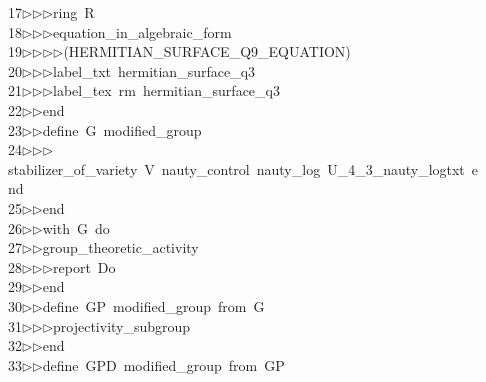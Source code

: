 \begin{tabbing}
17\>$\triangleright$\>$\triangleright$\>$\triangleright$\>ring\ R\ \\[0pt]
18\>$\triangleright$\>$\triangleright$\>$\triangleright$\>equation\_in\_algebraic\_form\ \\[0pt]
19\>$\triangleright$\>$\triangleright$\>$\triangleright$\>$\triangleright$\>(HERMITIAN\_SURFACE\_Q9\_EQUATION)\ \\[0pt]
20\>$\triangleright$\>$\triangleright$\>$\triangleright$\>label\_txt\ hermitian\_surface\_q3\ \\[0pt]
21\>$\triangleright$\>$\triangleright$\>$\triangleright$\>label\_tex\ rm\ hermitian\_surface\_q3\ \\[0pt]
22\>$\triangleright$\>$\triangleright$\>end\ \\[0pt]
23\>$\triangleright$\>$\triangleright$\>define\ G\ modified\_group\ \\[0pt]
24\>$\triangleright$\>$\triangleright$\>$\triangleright$\>stabilizer\_of\_variety\ V\ nauty\_control\ nauty\_log\ U\_4\_3\_nauty\_logtxt\ e\\[0pt]
\>nd\ \\[0pt]
25\>$\triangleright$\>$\triangleright$\>end\ \\[0pt]
26\>$\triangleright$\>$\triangleright$\>with\ G\ do\ \\[0pt]
27\>$\triangleright$\>$\triangleright$\>group\_theoretic\_activity\ \\[0pt]
28\>$\triangleright$\>$\triangleright$\>$\triangleright$\>report\ Do\ \\[0pt]
29\>$\triangleright$\>$\triangleright$\>end\ \\[0pt]
30\>$\triangleright$\>$\triangleright$\>define\ GP\ modified\_group\ from\ G\ \\[0pt]
31\>$\triangleright$\>$\triangleright$\>$\triangleright$\>projectivity\_subgroup\ \\[0pt]
32\>$\triangleright$\>$\triangleright$\>end\ \\[0pt]
33\>$\triangleright$\>$\triangleright$\>define\ GPD\ modified\_group\ from\ GP\ \\[0pt]

\end{tabbing}
